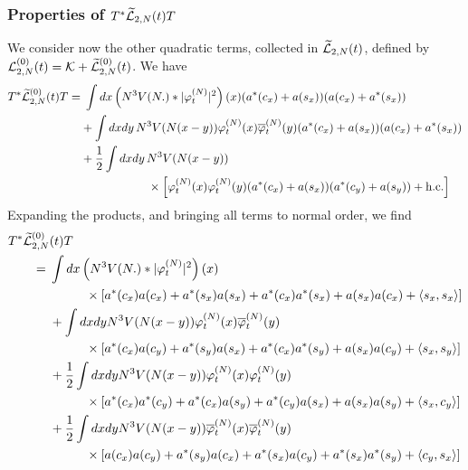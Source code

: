 \documentclass[11pt,a4paper,DIV11]{scrartcl}	%
\newcommand{\wt}{\widetilde}
\newcommand{\cK}{{\cal K}}
\newcommand{\cL}{{\cal L}}
\begin{document}
\subsubsection{Properties of $T^* \wt{\cL}_{2,N} (t) T$}

We consider now the other quadratic terms, collected in $\wt{\cL}_{2,N} (t)$, defined by $\cL^{(0)}_{2,N} (t) = \cK + \wt{\cL}_{2,N}^{(0)} (t)$. 
We have
\[ \begin{split} 
T^* \wt{\cL}_{2,N}^{(0)} (t) T = & \; \int dx \left( N^3 V (N .) * |\varphi_t^{(N)}|^2 \right) (x) (a^* (c_x) + a(s_x)) (a(c_x) + a^* (s_x)) \\ & + \int dx dy \, N^3 V(N(x-y)) \varphi_t^{(N)} (x) \overline{\varphi}_t^{(N)} (y) (a^* (c_x) + a(s_x)) (a (c_x) + a^* (s_x)) \\ &+ \frac{1}{2} \int dx dy \, N^3 V(N (x-y)) \\
&\hspace{2cm} \times \left[  \varphi_t^{(N)} (x) \varphi_t^{(N)} (y) (a^* (c_x) + a(s_x)) (a^* (c_y) + a (s_y)) + \text{h.c.}  \right] 
\end{split} \]
Expanding the products, and bringing all terms to normal order, we find
\begin{equation}\label{eq:T2T} \begin{split} 
T^*  \wt{\cL}_{2,N}^{(0)}& (t) T \\ =\; & \int dx \left(N^3 V (N .) * |\varphi_t^{(N)}|^2 \right) (x) \\ &\hspace{1cm}\times \left[  a^* (c_x) a (c_x) + a^* (s_x) a (s_x) + a^* (c_x) a^* (s_x) + a(s_x) a(c_x) + \langle s_x , s_x \rangle \right] \\
&+ \int dx dy N^3 V (N (x-y)) \varphi_t^{(N)} (x) \overline{\varphi}_t^{(N)} (y) \\ &\hspace{1cm}\times  \left[ a^* (c_x) a(c_y) + a^* (s_y) a(s_x) + a^* (c_x) a^* (s_y) + a(s_x) a(c_y) + \langle s_x , s_y \rangle \right] \\
&+ \frac{1}{2} \int dx dy N^3 V(N (x-y)) \varphi_t^{(N)} (x) \varphi_t^{(N)} (y) \\ &\hspace{1cm}\times \left[ a^* (c_x) a^* (c_y) + a^* (c_x) a(s_y) + a^* (c_y) a (s_x) + a(s_x) a(s_y) + \langle s_x , c_y \rangle \right] \\
&+ \frac{1}{2} \int dx dy N^3 V(N (x-y)) \overline{\varphi}_t^{(N)} (x) \overline{\varphi}_t^{(N)} (y) \\ &\hspace{1cm}\times \left[ a (c_x) a (c_y) + a^* (s_y) a(c_x) +  a^* (s_x) a(c_y) + a^* (s_x) a^* (s_y) + \langle c_y , s_x \rangle \right] 
\end{split} \end{equation}
\end{document}
